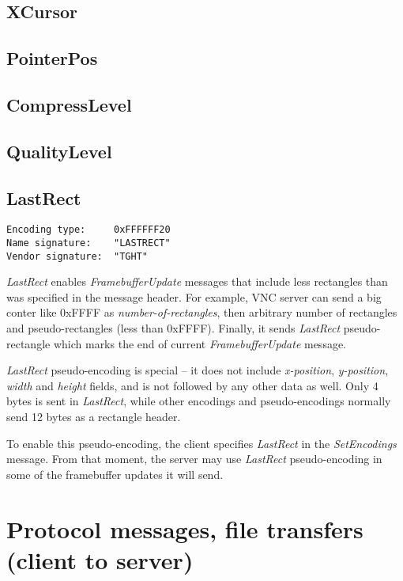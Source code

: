 \documentclass[a4paper]{article}
\newcommand{\typestr}[1]{\textit{#1}}
\begin{document}
\subsection{XCursor}
\subsection{PointerPos}
\subsection{CompressLevel}
\subsection{QualityLevel}

\subsection{LastRect}
\begin{verbatim}
Encoding type:     0xFFFFFF20
Name signature:    "LASTRECT"
Vendor signature:  "TGHT"
\end{verbatim}

\typestr{LastRect} enables \typestr{FramebufferUpdate} messages that
include less rectangles than was specified in the message header. For
example, VNC server can send a big conter like 0xFFFF as
\typestr{number-of-rectangles}, then arbitrary number of rectangles and
pseudo-rectangles (less than 0xFFFF). Finally, it sends
\typestr{LastRect} pseudo-rectangle which marks the end of current
\typestr{FramebufferUpdate} message.

\typestr{LastRect} pseudo-encoding is special -- it does not include
\typestr{x-position}, \typestr{y-position}, \typestr{width} and
\typestr{height} fields, and is not followed by any other data as
well. Only 4 bytes is sent in \typestr{LastRect}, while other
encodings and pseudo-encodings normally send 12 bytes as a rectangle
header.

To enable this pseudo-encoding, the client specifies
\typestr{LastRect} in the \typestr{SetEncodings} message. From that
moment, the server may use \typestr{LastRect} pseudo-encoding in some
of the framebuffer updates it will send.


\newpage
\section{Protocol messages, file transfers (client to server)}
\end{document}
